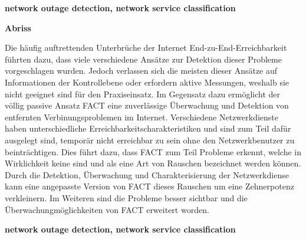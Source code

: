 \vspace{10em} 
\begin{center}
	\textbf{network outage detection, network service classification} \par 
\end{center}

\vfil

\newpage
\clearpage \null 
\vfil 
\begin{center}
	\textbf{Abriss} 
\end{center}

Die häufig auftrettenden Unterbrüche der Internet End-zu-End-Erreichbarkeit 
führten dazu, dass viele verschiedene Ansätze zur Detektion dieser Probleme 
vorgeschlagen wurden. Jedoch verlassen sich die meisten dieser Ansätze auf 
Informationen der Kontrollebene oder erfordern aktive Messungen, weshalb sie 
nicht geeignet sind für den Praxiseinsatz. Im Gegensatz dazu ermöglicht der 
völlig passive Ansatz FACT eine zuverlässige Überwachung und Detektion von 
entfernten Verbinungsproblemen im Internet. Verschiedene Netzwerkdienste haben  
unterschiedliche Erreichbarkeitscharakteristiken und sind zum Teil dafür 
ausgelegt sind, temporär nicht erreichbar zu sein ohne den Netzwerkbenutzer zu 
beinträchtigen. Dies führt dazu, dass FACT zum Teil Probleme erkennt, welche in 
Wirklichkeit keine sind und als eine Art von Rauschen bezeichnet werden können. 
Durch die Detektion, Überwachung und Charakterisierung der Netzwerkdiense kann 
eine angepasste Version von FACT dieses Rauschen um eine Zehnerpotenz 
verkleinern. Im Weiteren sind die Probleme besser sichtbar 
und die Überwachungmöglichkeiten von FACT erweitert worden.

\vspace{10em} 
\begin{center}
	\textbf{network outage detection, network service classification} \par 
\end{center}

\vfil
